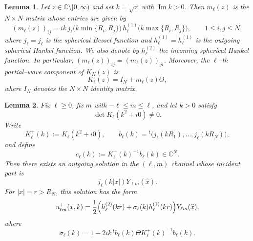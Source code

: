 \documentclass[10pt,a4paper]{amsart}
\newtheorem{lem}{Lemma}
\newcommand{\C}{\mathbb{C}}
\renewcommand{\Im}{\operatorname{Im}}
\newcommand{\hj}[1]{h^{(1)}_{#1}}
\newcommand{\jj}[1]{j_{#1}}
\begin{document}
\begin{lem}\label{lem:mell}
Let $z\in\C\setminus[0,\infty)$ and set $k=\sqrt{z}$ with $\Im k>0$.
Then $m_\ell(z)$ is the $N\times N$ matrix whose entries are given by
\begin{equation}\label{eq:mell-entry}
(m_\ell(z))_{ij}
=
ik\,\jj{\ell}\!\bigl(k\min\{R_i,R_j\}\bigr)\,
\hj{\ell}\!\bigl(k\max\{R_i,R_j\}\bigr),
\qquad 1\le i,j\le N,
\end{equation}
where $\jj{\ell}=j_\ell$ is the spherical Bessel function and
$\hj{\ell}=h_\ell^{(1)}$ is the outgoing spherical Hankel function.
We also denote by $h_\ell^{(2)}$ the incoming spherical Hankel function.
In particular, $(m_\ell(z))_{ij}=(m_\ell(z))_{ji}$.
Moreover, the $\ell$--th partial--wave component of $K_N(z)$ is
\begin{equation}\label{eq:Kell}
K_\ell(z)=I_N+m_\ell(z)\Theta,
\end{equation}
where $I_N$ denotes the $N\times N$ identity matrix.
\end{lem}

\begin{lem}
\label{lem:partial-wave-construction}
Fix $\ell\ge0$, fix $m$ with $-\ell\le m\le\ell$, and let
$k>0$ satisfy
\[
\det K_\ell(k^2+i0)\neq0.
\]
Write
\[
K_\ell^+(k):=K_\ell(k^2+i0),
\qquad
b_\ell(k)
=
{}^t\bigl(\jj{\ell}(kR_1),\ldots,\jj{\ell}(kR_N)\bigr),
\]
and define
\[
c_\ell(k):=K_\ell^+(k)^{-1}b_\ell(k)\in\C^N.
\]
Then there exists an outgoing solution in the $(\ell,m)$ channel whose
incident part is
\[
\jj{\ell}(k|x|)Y_{\ell m}(\widehat x).
\]
For $|x|=r>R_N$, this solution has the form
\begin{equation}\label{eq:ext-form-lemma}
u_{\ell m}^+(x,k)
=
\frac12
\Bigl(
h_\ell^{(2)}(kr)+\sigma_\ell(k)\hj{\ell}(kr)
\Bigr)
Y_{\ell m}(\widehat x),
\end{equation}
where
\begin{equation}\label{eq:sigma-lemma}
\sigma_\ell(k)
=
1-2ik\,{}^t b_\ell(k)\Theta K_\ell^+(k)^{-1}b_\ell(k).
\end{equation}
\end{lem}
\end{document}
